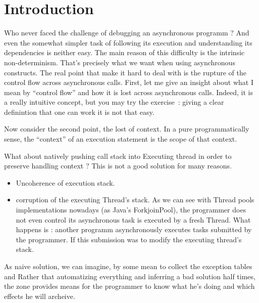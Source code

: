 
\chapter{Introduction}


Who never faced the challenge of debugging an asynchronous programm ? And even the somewhat simpler task of following its execution and understanding its dependencies is neither easy.
The main reason of this difficulty is the intrinsic non-determinism. That's precisely what we want when using asynchronous constructs. The real point that make it hard to deal with is the rupture of the control flow across asynchronous calls.
First, let me give an insight about what I mean by ``control flow'' and how it is lost across asynchronous calls. Indeed, it is a really intuitive concept, but you may try the exercise~: giving a clear definintion that one can work it is not that easy.

Now consider the second point, the lost of context. In a pure programmatically sense, the ``context'' of an execution statement is the scope of that context. 


What about natively pushing call stack into Executing thread in order to preserve handling context ? This is not a good solution for many reasons.
\begin{itemize}
\item Uncoherence of execution stack. 
\item corruption of the executing Thread's stack. As we can see with Thread pools implementations nowadays (as Java's ForkjoinPool), the programmer does not even control its asynchronous task is executed by a fresh Thread. What happens is : another programm asynchronously executes tasks submitted by the programmer. If this submission was to modify the executing thread's stack.
\end{itemize}
As naive solution, we can imagine, by some mean to collect the exception tables and 
Rather that automatizing everything and inferring a bad solution half times, the zone provides means for the programmer to know what he's doing and which effects he will archeive.